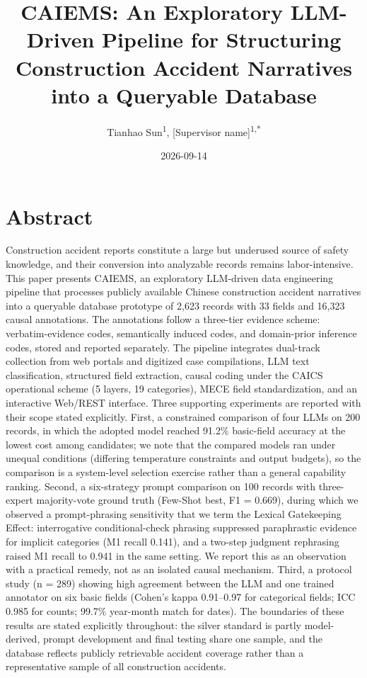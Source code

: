 \documentclass[11pt]{article}
\title{CAIEMS: An Exploratory LLM-Driven Pipeline for Structuring Construction Accident Narratives into a Queryable Database}
\author{Tianhao Sun\textsuperscript{1}, [Supervisor name]\textsuperscript{1,*}}
\date{2026-09-14}
\begin{document}
\maketitle

\section*{Abstract}
Construction accident reports constitute a large but underused source of safety knowledge, and their conversion into analyzable records remains labor-intensive. This paper presents CAIEMS, an exploratory LLM-driven data engineering pipeline that processes publicly available Chinese construction accident narratives into a queryable database prototype of 2,623 records with 33 fields and 16,323 causal annotations. The annotations follow a three-tier evidence scheme: verbatim-evidence codes, semantically induced codes, and domain-prior inference codes, stored and reported separately. The pipeline integrates dual-track collection from web portals and digitized case compilations, LLM text classification, structured field extraction, causal coding under the CAICS operational scheme (5 layers, 19 categories), MECE field standardization, and an interactive Web/REST interface. Three supporting experiments are reported with their scope stated explicitly. First, a constrained comparison of four LLMs on 200 records, in which the adopted model reached 91.2\% basic-field accuracy at the lowest cost among candidates; we note that the compared models ran under unequal conditions (differing temperature constraints and output budgets), so the comparison is a system-level selection exercise rather than a general capability ranking. Second, a six-strategy prompt comparison on 100 records with three-expert majority-vote ground truth (Few-Shot best, F1 = 0.669), during which we observed a prompt-phrasing sensitivity that we term the Lexical Gatekeeping Effect: interrogative conditional-check phrasing suppressed paraphrastic evidence for implicit categories (M1 recall 0.141), and a two-step judgment rephrasing raised M1 recall to 0.941 in the same setting. We report this as an observation with a practical remedy, not as an isolated causal mechanism. Third, a protocol study (n = 289) showing high agreement between the LLM and one trained annotator on six basic fields (Cohen's kappa 0.91--0.97 for categorical fields; ICC 0.985 for counts; 99.7\% year-month match for dates). The boundaries of these results are stated explicitly throughout: the silver standard is partly model-derived, prompt development and final testing share one sample, and the database reflects publicly retrievable accident coverage rather than a representative sample of all construction accidents.
\end{document}
